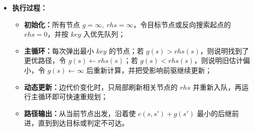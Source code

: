 \documentclass[../main.tex]{subfiles}
\begin{document}
\begin{enumerate}
\begin{itemize}
{        {\small\kaishu
        例如，设节点 $s$ 有两个后继节点 $a,b$，并且
        $$
        c(s,a)=2,\qquad g(a)=5
        $$
        $$
        c(s,b)=3,\qquad g(b)=10
        $$
        则
        $$
        rhs(s)=\min\{c(s,a)+g(a),\ c(s,b)+g(b)\}
        $$
        $$
        =\min\{2+5,\ 3+10\}
        =\min\{7,\ 13\}
        =7
        $$
        这说明：按照当前已知信息，从节点 $s$ 出发到目标的最优走法，是先走到 $a$，总代价估计为 $7$。
        
        若此时节点 $s$ 当前记录的值为
        $$
        g(s)=9
        $$
        则说明当前记录偏大，因为
        $$
        g(s)>rhs(s)
        $$
        表示已经找到了一条更优路径，应将 $g(s)$ 向 $rhs(s)$ 修正。
        
        若
        $$
        g(s)=7
        $$
        则有
        $$
        g(s)=rhs(s)
        $$
        说明该节点当前是一致的。
        
        若
        $$
        g(s)=4
        $$
        则有
        $$
        g(s)<rhs(s)
        $$
        说明当前记录过于乐观，已经不能由当前后继信息支持，需要重新增大并继续传播更新。
        }
                
        
        }
        \item \textbf{执行过程：}
        \begin{itemize}
            \item \textbf{初始化：}所有节点 $g=\infty,\ rhs=\infty$，令目标节点或反向搜索起点的 $rhs=0$，并按 $key$ 入优先队列；
            \item \textbf{主循环：}每次弹出最小 $key$ 的节点；若 $g(s)>rhs(s)$，则说明找到了更优路径，令 $g(s)\leftarrow rhs(s)$；若 $g(s)<rhs(s)$，则说明旧估计偏小，令 $g(s)\leftarrow \infty$ 后重新计算，并把受影响前驱继续更新；
            \item \textbf{动态更新：}边代价变化时，只局部刷新相关节点的 $rhs$ 并重新入队，再运行主循环即可快速重规划；
            \item \textbf{路径输出：}从当前节点出发，沿着使 $c(s,s')+g(s')$ 最小的后继前进，直到到达目标或判定不可达。
        \end{itemize}
    \end{itemize}
    

\end{enumerate}
\end{document}
